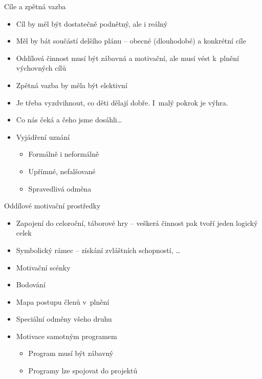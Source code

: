 \documentclass[compress,utf8,xcolor=dvipsnames]{beamer}
\begin{document}
\begin{frame}{Cíle a zpětná vazba}
\begin{multicols}{2}
\begin{itemize}
\item Cíl by měl být dostatečně podnětný, ale i reálný
\item Měl by bát součástí delšího plánu -- obecné (dlouhodobé) a konkrétní cíle
\item Oddílová činnost musí být zábavná a motivační, ale musí vést k~plnění výchovných cílů
\end{itemize}
\columnbreak
\begin{itemize}
\item Zpětná vazba by měla být elektivní
\item Je třeba vyzdvihnout, co děti dělají dobře. I~malý pokrok je výhra.
\item Co nás čeká a čeho jsme dosáhli\ldots
\item Vyjádření uznání
 \begin{itemize}
 \item Formálně i neformálně
 \item Upřímné, nefalšované
 \item Spravedlivá odměna
 \end{itemize}
\end{itemize}
\end{multicols}
\end{frame}

\begin{frame}{Oddílové motivační prostředky}
\begin{itemize}
\item Zapojení do celoroční, táborové hry -- veškerá činnost pak tvoří jeden logický celek
\item Symbolický rámec -- získání zvláštních schopností, \ldots
\item Motivační scénky
\item Bodování
\item Mapa postupu členů v~plnění
\item Speciální odměny všeho druhu
\item Motivace samotným programem
 \begin{itemize}
 \item Program musí být zábavný
 \item Programy lze spojovat do projektů
 \end{itemize}
\end{itemize}
\end{frame}
\end{document}
